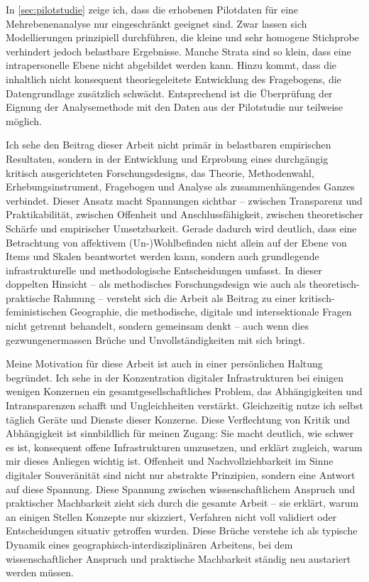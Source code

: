In \cref{sec:pilotstudie} zeige ich, dass die erhobenen Pilotdaten für eine  Mehrebenenanalyse nur eingeschränkt geeignet sind. Zwar lassen sich Modellierungen prinzipiell durchführen, die kleine und sehr homogene Stichprobe verhindert jedoch belastbare Ergebnisse. Manche Strata sind so klein, dass eine intrapersonelle Ebene nicht abgebildet werden kann. Hinzu kommt, dass die inhaltlich nicht konsequent theoriegeleitete Entwicklung des Fragebogens, die Datengrundlage zusätzlich schwächt. Entsprechend ist die Überprüfung der Eignung der Analysemethode mit den Daten aus der Pilotstudie nur teilweise möglich.

Ich sehe den Beitrag dieser Arbeit nicht primär in belastbaren empirischen Resultaten, sondern in der Entwicklung und Erprobung eines durchgängig kritisch ausgerichteten Forschungsdesigns, das Theorie, Methodenwahl, Erhebungsinstrument, Fragebogen und Analyse als zusammenhängendes Ganzes verbindet. Dieser Ansatz macht Spannungen sichtbar -- zwischen Transparenz und Praktikabilität, zwischen Offenheit und Anschlussfähigkeit, zwischen theoretischer Schärfe und empirischer Umsetzbarkeit. Gerade dadurch wird deutlich, dass eine  Betrachtung von affektivem (Un-)Wohlbefinden nicht allein auf der Ebene von Items und Skalen beantwortet werden kann, sondern auch grundlegende infrastrukturelle und methodologische Entscheidungen umfasst. In dieser doppelten Hinsicht -- als methodisches Forschungsdesign wie auch als theoretisch-praktische Rahmung -- versteht sich die Arbeit als Beitrag zu einer kritisch-feministischen Geographie, die methodische, digitale und intersektionale Fragen nicht getrennt behandelt, sondern gemeinsam denkt -- auch wenn dies gezwungenermassen Brüche und Unvollständigkeiten mit sich bringt.

Meine Motivation für diese Arbeit ist auch in einer persönlichen Haltung begründet. Ich sehe in der Konzentration digitaler Infrastrukturen bei einigen wenigen Konzernen ein gesamtgesellschaftliches Problem, das Abhängigkeiten und Intransparenzen schafft und Ungleichheiten verstärkt. Gleichzeitig nutze ich selbst täglich Geräte und Dienste dieser Konzerne. Diese Verflechtung von Kritik und Abhängigkeit ist sinnbildlich für meinen Zugang: Sie macht deutlich, wie schwer es ist, konsequent offene Infrastrukturen umzusetzen, und erklärt zugleich, warum mir dieses Anliegen wichtig ist. Offenheit und Nachvollziehbarkeit im Sinne digitaler Souveränität sind nicht nur abstrakte Prinzipien, sondern eine Antwort auf diese Spannung. Diese Spannung zwischen wissenschaftlichem Anspruch und praktischer Machbarkeit zieht sich durch die gesamte Arbeit -- sie erklärt, warum an einigen Stellen Konzepte nur skizziert, Verfahren nicht voll validiert oder Entscheidungen situativ getroffen wurden. Diese Brüche verstehe ich als typische Dynamik eines geographisch-interdisziplinären Arbeitens, bei dem wissenschaftlicher Anspruch und praktische Machbarkeit ständig neu austariert werden müssen.

